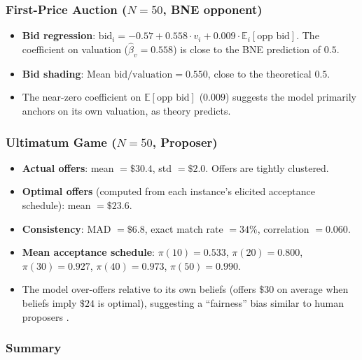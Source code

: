 \documentclass[12pt]{article}
\newcommand{\E}{\mathbb{E}}
\begin{document}
\subsubsection{First-Price Auction ($N=50$, BNE opponent)}

\begin{itemize}[nosep]
    \item \textbf{Bid regression}: $\text{bid}_i = -0.57 + 0.558 \cdot v_i + 0.009 \cdot \E_i[\text{opp bid}]$. The coefficient on valuation ($\hat\beta_v = 0.558$) is close to the BNE prediction of $0.5$.
    \item \textbf{Bid shading}: Mean $\text{bid}/\text{valuation} = 0.550$, close to the theoretical $0.5$.
    \item The near-zero coefficient on $\E[\text{opp bid}]$ ($0.009$) suggests the model primarily anchors on its own valuation, as theory predicts.
\end{itemize}

\subsubsection{Ultimatum Game ($N=50$, Proposer)}

\begin{itemize}[nosep]
    \item \textbf{Actual offers}: mean $= \$30.4$, std $= \$2.0$. Offers are tightly clustered.
    \item \textbf{Optimal offers} (computed from each instance's elicited acceptance schedule): mean $= \$23.6$.
    \item \textbf{Consistency}: MAD $= \$6.8$, exact match rate $= 34\%$, correlation $= 0.060$.
    \item \textbf{Mean acceptance schedule}: $\pi(10)=0.533$, $\pi(20)=0.800$, $\pi(30)=0.927$, $\pi(40)=0.973$, $\pi(50)=0.990$.
    \item The model over-offers relative to its own beliefs (offers $\$30$ on average when beliefs imply $\$24$ is optimal), suggesting a ``fairness'' bias similar to human proposers \citep{guth1982experimental}.
\end{itemize}

\subsubsection{Summary}
\end{document}
